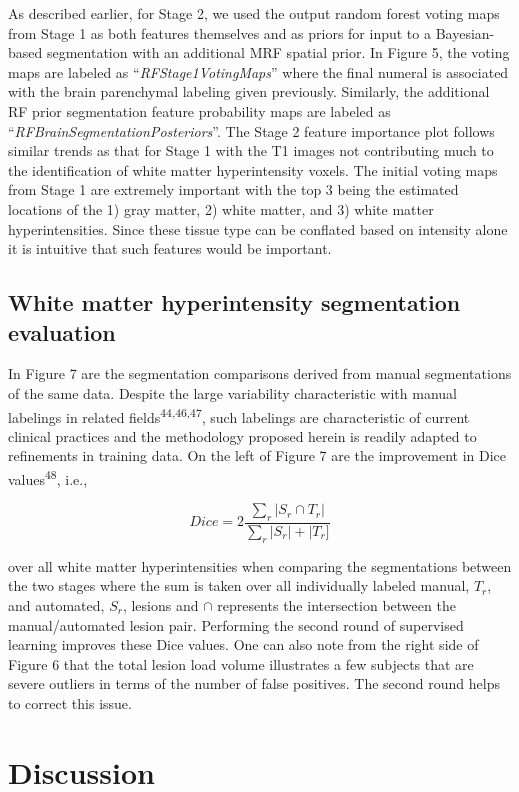 \documentclass[11pt,]{article}
\begin{document}
As described earlier, for Stage 2, we used the output random forest
voting maps from Stage 1 as both features themselves and as priors for
input to a Bayesian-based segmentation with an additional MRF spatial
prior. In Figure 5, the voting maps are labeled as
``\emph{RFStage1VotingMaps}'' where the final numeral is associated with
the brain parenchymal labeling given previously. Similarly, the
additional RF prior segmentation feature probability maps are labeled as
``\emph{RFBrainSegmentationPosteriors}''. The Stage 2 feature importance
plot follows similar trends as that for Stage 1 with the T1 images not
contributing much to the identification of white matter hyperintensity
voxels. The initial voting maps from Stage 1 are extremely important
with the top 3 being the estimated locations of the 1) gray matter, 2)
white matter, and 3) white matter hyperintensities. Since these tissue
type can be conflated based on intensity alone it is intuitive that such
features would be important.

\subsection{White matter hyperintensity segmentation
evaluation}\label{white-matter-hyperintensity-segmentation-evaluation}

In Figure 7 are the segmentation comparisons derived from manual
segmentations of the same data. Despite the large variability
characteristic with manual labelings in related
fields\textsuperscript{44,46,47}, such labelings are characteristic of
current clinical practices and the methodology proposed herein is
readily adapted to refinements in training data. On the left of Figure 7
are the improvement in Dice values\textsuperscript{48}, i.e.,

\[ Dice = 2 \frac{\sum_r|S_r \cap T_r|}{\sum_r|S_r| + |T_r] } \]

over all white matter hyperintensities when comparing the segmentations
between the two stages where the sum is taken over all individually
labeled manual, \(T_r\), and automated, \(S_r\), lesions and \(\cap\)
represents the intersection between the manual/automated lesion pair.
Performing the second round of supervised learning improves these Dice
values. One can also note from the right side of Figure 6 that the total
lesion load volume illustrates a few subjects that are severe outliers
in terms of the number of false positives. The second round helps to
correct this issue.

\section{Discussion}\label{discussion}
\end{document}
